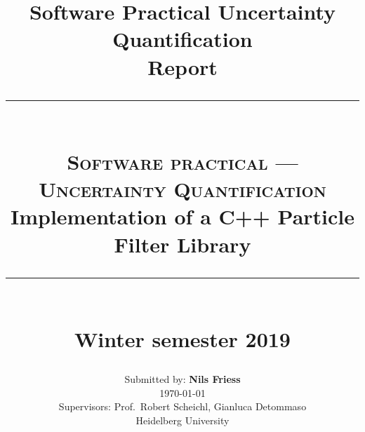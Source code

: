 \documentclass[
fontsize=11pt,
paper=a4,
numbers=noenddot,
parskip=half
]{scrartcl}
\title{{\normalsize Software Practical Uncertainty Quantification}\\Report}
\newcommand{\HRule}{\rule{.9\linewidth}{.6pt}}
\begin{document}
 
\title{ \normalsize
  \HRule\\[0.5cm]
  \large \textsc{Software practical --- Uncertainty Quantification}\\
  \LARGE {Implementation of a C++ Particle Filter Library}\\
  \HRule\\[0.5cm]
  \normalsize Winter semester 2019 \vfill }

\date{}

\author{ \large
  Submitted by: \textbf{Nils Friess}\\
  {\small\today}\\[3ex]
  \normalsize
  Supervisors: Prof.\ Robert Scheichl, Gianluca Detommaso \\
  \normalsize Heidelberg University }

\clearpage\maketitle
\thispagestyle{empty}
\newpage
\setcounter{page}{1}



 
\printbibliography
\end{document}
